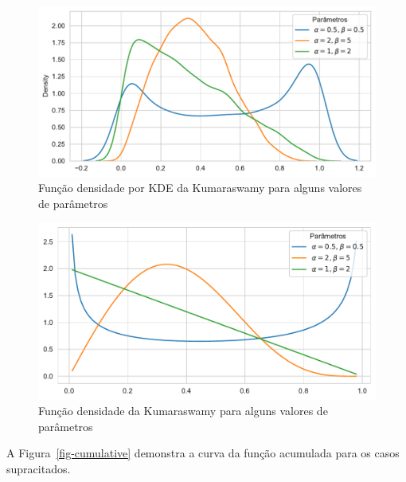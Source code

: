 \documentclass[
]{article}
\begin{document}
\begin{figure}[H]

{\centering \includegraphics{report_files/figure-pdf/fig-density1-output-1.pdf}

}

\caption{\label{fig-density1}Função densidade por KDE da Kumaraswamy
para alguns valores de parâmetros}

\end{figure}

\begin{figure}[H]

{\centering \includegraphics{report_files/figure-pdf/fig-density2-output-1.pdf}

}

\caption{\label{fig-density2}Função densidade da Kumaraswamy para alguns
valores de parâmetros}

\end{figure}

A Figura~\ref{fig-cumulative} demonstra a curva da função acumulada para
os casos supracitados.
\end{document}
